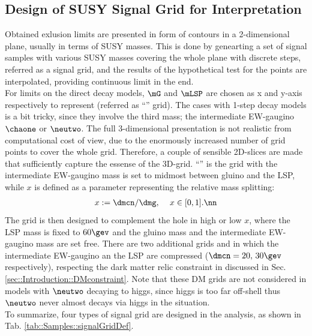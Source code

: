 

\subsection{Design of SUSY Signal Grid for Interpretation} 
Obtained exlusion limits are presented in form of contours in a 2-dimensional plane, usually in terms of SUSY masses. This is done by genearting a set of signal samples with various SUSY masses covering the whole plane with discrete steps, referred as a signal grid, and the results of the hypothetical test for the points are interpolated, providing continuous limit in the end. \\

For limits on the direct decay models, $\mG$ and $\mLSP$ are chosen as x and y-axis respectively to represent (referred as ``\dire'' grid). The cases with 1-step decay models is a bit tricky, since they involve the third mass; the intermediate EW-gaugino $\chaone$ or $\neutwo$. The full 3-dimensional presentation is not realistic from computational cost of view, due to the enormously increased number of grid points to cover the whole grid. Therefore, a couple of sensible 2D-slices are made that sufficiently capture the essense of the 3D-grid. ``\xhalf'' is the grid with the intermediate EW-gaugino mass is set to midmost between gluino and the LSP, while $x$ is defined as a parameter representing the relative mass splitting:
\begin{align}
  x := \dmcn/\dmg, \,\,\,\,\,\,\, x \in [0,1]. \nn
\end{align}
The \varx grid is then designed to complement the hole in high or low $x$, where the LSP mass is fixed to $60\gev$ and the gluino mass and the intermediate EW-gaugino mass are set free. There are two additional grids \DMtw and \DMth in which the intermediate EW-gaugino an the LSP are compressed ($\dmcn=20, \, 30\gev$ respectively), respecting the dark matter relic constraint in discussed in Sec. \ref{sec::Introduction::DMconstraint}. Note that these DM grids are not considered in models with $\neutwo$ decaying to higgs, since higgs is too far off-shell thus $\neutwo$ never almost decays via higgs in the situation. \\
To summarize, four types of signal grid are designed in the analysis, as shown in Tab. \ref{tab::Samples::signalGridDef}. 


